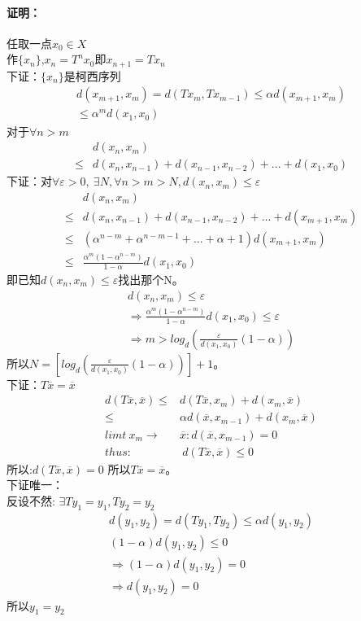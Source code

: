 \documentclass[11pt]{article}
\begin{document}
\begin{CJK*}{UTF8}{gbsn}
\paragraph{证明：}
任取一点$x_0\in X$\\
作$\{x_n\}$,$x_n=T^nx_0$即$x_{n+1}=Tx_n$\\
下证：$\{x_n\}$是柯西序列\\
\begin{align*}
	d(x_{m+1},x_{m})=d(Tx_{m},Tx_{m-1})\leq \alpha d(x_{m+1},x_{m})
	\\
	\leq \alpha^m d(x_1,x_0)
\end{align*}
对于$\forall n>m$
\begin{align*}
	&d(x_n,x_m)\\
	\leq & d(x_n,x_{n-1})+d(x_{n-1},x_{n-2})+...+d(x_1,x_0)
\end{align*}
下证：对$\forall \varepsilon>0,~\exists N,\forall n>m>N,d(x_n,x_m)\leq \varepsilon$
\begin{align*}
	&d(x_{n},x_{m})\\
	\leq &d(x_{n},x_{n-1})+d(x_{n-1},x_{n-2})+...+d(x_{m+1},x_{m})\\
	\leq & (\alpha^{n-m}+\alpha^{n-m-1}+...+\alpha+1)d(x_{m+1},x_{m})\\
	\leq &\frac{\alpha^m(1-\alpha^{n-m} )}{1-\alpha}d(x_{1},x_{0})
\end{align*}
即已知$d(x_n,x_m)\leq \varepsilon$找出那个N。
\begin{align*}
	d(x_n,x_m)\leq \varepsilon\\
	\Rightarrow \frac{\alpha^m(1-\alpha^{n-m} )}{1-\alpha}d(x_{1},x_{0})\leq \varepsilon\\
	\Rightarrow m>log_d(\frac{\varepsilon}{d(x_1,x_0)}(1-\alpha) )
\end{align*}
所以$N=[log_d(\frac{\varepsilon}{d(x_1,x_0)}(1-\alpha) )]+1$。\\
下证：$T\overline{x}=\overline{x}$
\begin{align*}
	d(T\overline{x},\overline{x} )\leq &d(T\overline{x},x_m )+d(x_m,\overline{x} )\\
	\leq &\alpha d(\overline{x},x_{m-1})+d(x_m,\overline{x} )\\
	limt~x_m\rightarrow &\overline{x}:d(\overline{x},x_{m-1})=0\\
	thus:&~d(T\overline{x},\overline{x} )\leq 0
\end{align*}
所以:$d(T\overline{x},\overline{x} )= 0$
所以$T\overline{x}=\overline{x}$。\\
下证唯一：\\
反设不然:
$\exists Ty_1=y_1,Ty_2=y_2$\\
\begin{align*}
	d(y_1,y_2)=d(Ty_1,Ty_2)\leq \alpha d(y_1,y_2)\\
	(1-\alpha)d(y_1,y_2)\leq 0\\
	\Rightarrow (1-\alpha )d(y_1,y_2)=0\\
	\Rightarrow d(y_1,y_2)=0
\end{align*}
所以$y_1=y_2$
\pagebreak

\end{CJK*}
\end{document}
